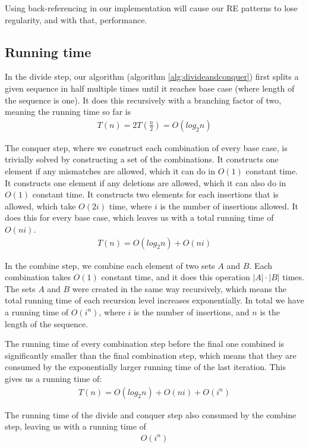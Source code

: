 \documentclass[12pt]{article}
\theoremstyle{definition}
\begin{document}
Using back-referencing in our implementation will cause our RE patterns to lose regularity, and with that, performance.


\subsection{Running time}

In the divide step, our algorithm (algorithm \ref{alg:divideandconquer}) first splits a given sequence in half multiple times until it reaches base case (where length of the sequence is one). It does this recursively with a branching factor of two, meaning the running time so far is 
\begin{eqnarray}
	T(n) = 2T(\frac{n}{2}) = O(log_2n)
\end{eqnarray}

The conquer step, where we construct each combination of every base case, is trivially solved by constructing a set of the combinations. It constructs one element if any mismatches are allowed, which it can do in $O(1)$ constant time. It constructs one element if any deletions are allowed, which it can also do in $O(1)$ constant time. It constructs two elements for each insertions that is allowed, which take $O(2i)$ time, where $i$ is the number of insertions allowed. It does this for every base case, which leaves us with a total running time of $O(ni)$.
\begin{eqnarray}
	T(n) = O(log_2n) + O(ni)
\end{eqnarray}

In the combine step, we combine each element of two sets $A$ and $B$. Each combination takes $O(1)$ constant time, and it does this operation $|A| \cdot |B|$ times. The sets $A$ and $B$ were created in the same way recursively, which means the total running time of each recursion level increases exponentially. In total we have a running time of $O(i^n)$, where $i$ is the number of insertions, and $n$ is the length of the sequence.

The running time of every combination step before the final one combined is significantly smaller than the final combination step, which means that they are consumed by the exponentially larger running time of the last iteration. This gives us a running time of:
\begin{eqnarray}
	T(n) = O(log_2n) + O(ni) + O(i^n)
\end{eqnarray}

The running time of the divide and conquer step also consumed by the combine step, leaving us with a running time of
\begin{eqnarray}
	O(i^n)
\end{eqnarray}
\end{document}
